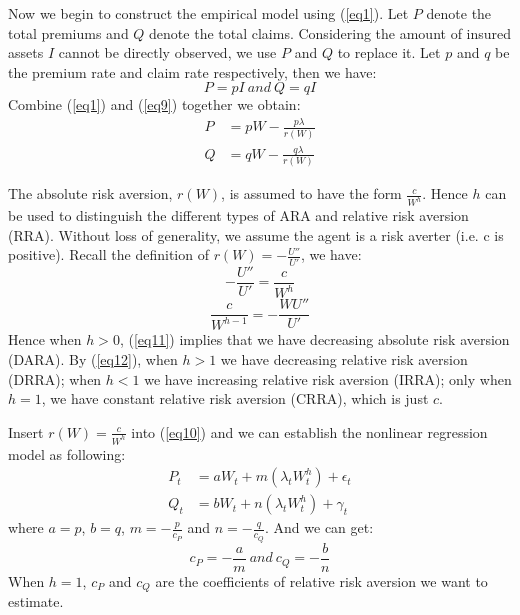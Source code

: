 \documentclass[11pt, a4paper, leqno]{article}
\begin{document}
Now we begin to construct the empirical model using (\ref{eq1}). Let $P$ denote the total premiums and $Q$ denote the total claims. Considering the amount of insured assets $I$ cannot be directly observed, we use $P$ and $Q$ to replace it. Let $p$ and $q$ be the premium rate and claim rate respectively, then we have:
\begin{equation}\label{eq9}
P=pI\ and\ Q=qI
\end{equation}
Combine (\ref{eq1}) and (\ref{eq9}) together we obtain:
\begin{equation}\label{eq10}
\begin{aligned}
P&=pW-\frac{p\lambda}{r(W)}\\
Q&=qW-\frac{q\lambda}{r(W)}
\end{aligned}
\end{equation}

The absolute risk aversion, $r(W)$, is assumed to have the form $\frac{c}{W^{h}}$. Hence $h$ can be used to distinguish the different types of ARA and relative risk aversion (RRA). Without loss of generality, we assume the agent is a risk averter (i.e. c is positive). Recall the definition of $r(W)=-\frac{U''}{U'}$, we have:
\begin{equation}\label{eq11}
-\frac{U''}{U'}=\frac{c}{W^{h}}
\end{equation}
\begin{equation}\label{eq12}
\frac{c}{W^{h-1}}=-\frac{WU''}{U'}
\end{equation}
Hence when $h>0$, (\ref{eq11}) implies that we have decreasing absolute risk aversion (DARA). By (\ref{eq12}), when $h>1$ we have decreasing relative risk aversion (DRRA); when $h<1$ we have increasing relative risk aversion (IRRA); only when $h=1$, we have constant relative risk aversion (CRRA), which is just $c$. 

Insert $r(W)=\frac{c}{W^{h}}$ into (\ref{eq10}) and we can establish the nonlinear regression model as following:
\begin{equation}\label{eq13}
\begin{aligned}
P_{t}&=aW_{t}+m(\lambda_{t}W_{t}^{h})+\epsilon_{t}\\
Q_{t}&=bW_{t}+n(\lambda_{t}W_{t}^{h})+\gamma_{t}
\end{aligned}
\end{equation}
where $a=p$, $b=q$, $m=-\frac{p}{c_P}$ and $n=-\frac{q}{c_Q}$. And we can get:
\begin{equation}\label{eq14}
c_{P}=-\frac{a}{m}\ and\ c_{Q}=-\frac{b}{n}
\end{equation}
When $h=1$, $c_{P}$ and $c_{Q}$ are the coefficients of relative risk aversion we want to estimate.
\end{document}
